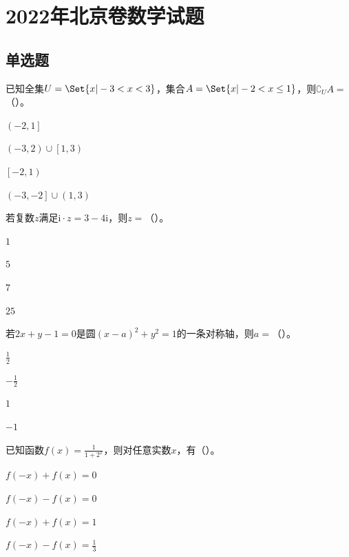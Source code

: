 \documentclass[fontset=founder]{ucedubook}
\begin{document}
\chapter*{2022年北京卷数学试题}

\section{单选题}

\begin{ti}[.16]
  已知全集$U=\Set{x|-3<x<3}$，集合$A=\Set{x|-2<x\le 1}$，则$\complement_U A=$（\qquad）。

  \begin{choices}
    \item $\left(-2,1\right]$
    \item $\left(-3,2\right)\cup\left[1,3\right)$
    \item $\left[-2,1\right)$
    \item $\left(-3,-2\right]\cup\left(1,3\right)$
  \end{choices}
\end{ti}


\begin{ti}[.16]
  若复数$z$满足$\mathrm{i}\cdot z=3-4\mathrm{i}$，则$z=$（\qquad）。

  \begin{choices}
    \item $1$
    \item $5$
    \item $7$
    \item $25$
  \end{choices}
\end{ti}


\begin{ti}[.16]
  若$2x+y-1=0$是圆$(x-a)^2+y^2=1$的一条对称轴，则$a=$（\qquad）。

  \begin{choices}
    \item $\frac{1}{2}$
    \item $-\frac{1}{2}$
    \item $1$
    \item $-1$
  \end{choices}
\end{ti}


\begin{ti}[.16]
  已知函数$f(x)=\frac{1}{1+2^x}$，则对任意实数$x$，有（\qquad）。

  \begin{choices}
    \item $f(-x)+f(x)=0$
    \item $f(-x)-f(x)=0$
    \item $f(-x)+f(x)=1$
    \item $f(-x)-f(x)=\frac{1}{3}$
  \end{choices}
\end{ti}
\end{document}

